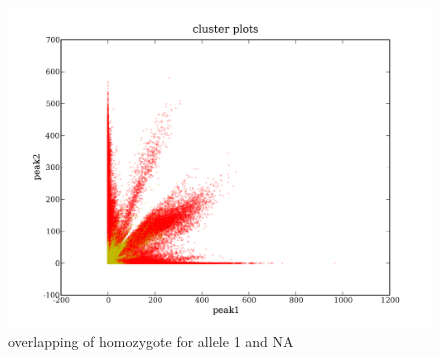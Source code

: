\documentclass[a4paper,10pt]{article}
\begin{document}
\begin{figure}
\includegraphics[width=1\textwidth]{figures/cluster_plots_allele1_NA.png}
\caption{overlapping of homozygote for allele 1 and NA}\label{f7}
\end{figure}


\end{document}
